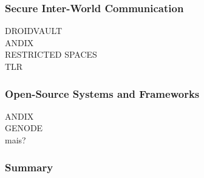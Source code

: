 \subsubsection{Secure Inter-World Communication}

DROIDVAULT\\
ANDIX\\
RESTRICTED SPACES\\
TLR

\subsubsection{Open-Source Systems and Frameworks}

ANDIX\\
GENODE\\
mais?

\subsubsection{Summary}

